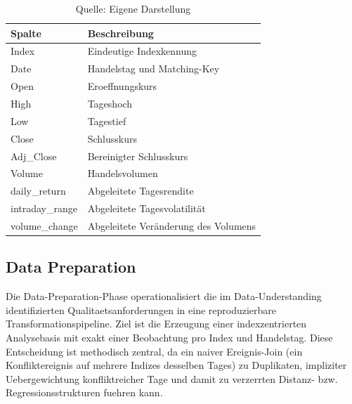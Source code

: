 \documentclass[12pt,a4paper]{article}
\begin{document}
\begin{table}[h!]
\centering
\caption{Genutzte Attribute aus den Indexdaten (Kaggle)}
\label{tab:index_used_attrs}
\begin{tabular}{@{}ll@{}}
\toprule
Spalte & Beschreibung \\ \midrule
Index & Eindeutige Indexkennung \\
Date & Handelstag und Matching-Key \\
Open & Eroeffnungskurs \\
High & Tageshoch \\
Low & Tagestief \\
Close & Schlusskurs \\
Adj\_Close & Bereinigter Schlusskurs \\
Volume & Handelsvolumen \\
daily\_return & Abgeleitete Tagesrendite \\
intraday\_range & Abgeleitete Tagesvolatilität \\
volume\_change & Abgeleitete Veränderung des Volumens \\ \bottomrule
\end{tabular}
\caption*{\footnotesize Quelle: Eigene Darstellung}
\end{table}

\subsection{Data Preparation}
Die Data-Preparation-Phase operationalisiert die im Data-Understanding identifizierten
Qualitaetsanforderungen in eine reproduzierbare Transformationspipeline.
Ziel ist die Erzeugung einer indexzentrierten Analysebasis mit exakt einer
Beobachtung pro Index und Handelstag. Diese Entscheidung ist methodisch zentral, da ein
naiver Ereignis-Join (ein Konfliktereignis auf mehrere Indizes desselben Tages) zu
Duplikaten, impliziter Uebergewichtung konfliktreicher Tage und damit zu verzerrten
Distanz- bzw. Regressionsstrukturen fuehren kann.
\end{document}
